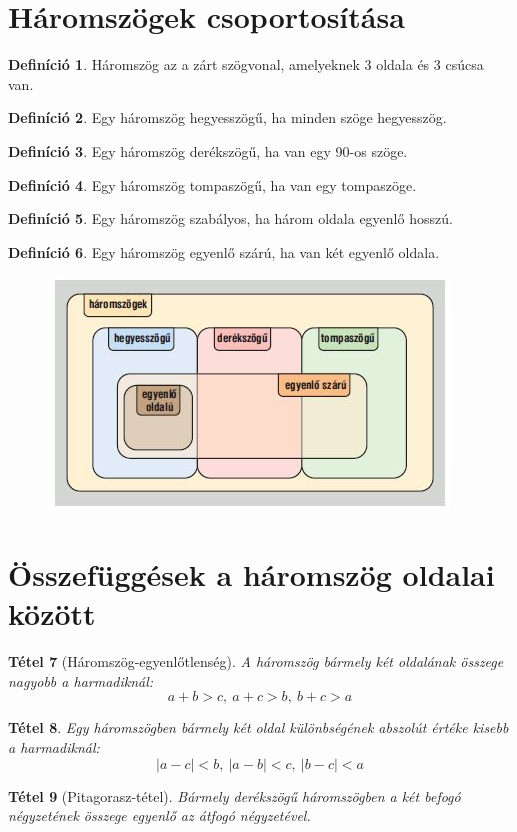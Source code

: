 \documentclass[twoside,12pt]{report}
\newtheorem{theorem}{Tétel}[section]
\theoremstyle{definition}
\newtheorem{definition}[theorem]{Definíció}
\begin{document}
\section{Háromszögek csoportosítása}
	\begin{definition}
		Háromszög az a zárt szögvonal, amelyeknek 3 oldala és 3 csúcsa van.
	\end{definition}
	\begin{definition}
		Egy háromszög hegyesszögű, ha minden szöge hegyesszög.
	\end{definition}
	\begin{definition}
		Egy háromszög derékszögű, ha van egy 90\degree-os szöge.
	\end{definition}
	\begin{definition}
		Egy háromszög tompaszögű, ha van egy tompaszöge.
	\end{definition}
	\begin{definition}
		Egy háromszög szabályos, ha három oldala egyenlő hosszú.
	\end{definition}
	\begin{definition}
		Egy háromszög egyenlő szárú, ha van két egyenlő oldala.
	\end{definition}
	\begin{figure}[H]
		\centering
		\includegraphics[width=0.6\linewidth]{Csoport}
	\end{figure}
\section{Összefüggések a háromszög oldalai között}
	\begin{theorem}[Háromszög-egyenlőtlenség]
		A háromszög bármely két oldalának összege nagyobb a harmadiknál:
		\begin{equation*}
			a+b>c,\ a+c>b,\ b+c>a
		\end{equation*}
	\end{theorem}
	\begin{theorem}
		Egy háromszögben bármely két oldal különbségének abszolút értéke kisebb a harmadiknál:
		\begin{equation*}
			|a-c|<b,\ |a-b|<c,\ |b-c|<a
		\end{equation*}
	\end{theorem}
	\begin{theorem}[Pitagorasz-tétel]
		Bármely derékszögű háromszögben a két befogó négyzetének összege egyenlő az átfogó négyzetével.
	\end{theorem}
\end{document}
